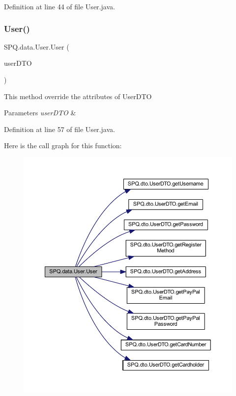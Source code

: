 Definition at line 44 of file User.\+java.

\mbox{\label{class_s_p_q_1_1data_1_1_user_af8e381901a649027950a0b0f8b22a235}} 
\subsubsection{\texorpdfstring{User()}{User()}\hspace{0.1cm}{\footnotesize\ttfamily [4/5]}}
{\footnotesize\ttfamily S\+P\+Q.\+data.\+User.\+User (\begin{DoxyParamCaption}\item[{\mbox{\hyperlink{class_s_p_q_1_1dto_1_1_user_d_t_o}{User\+D\+TO}}}]{user\+D\+TO }\end{DoxyParamCaption})}

This method override the attributes of User\+D\+TO 
\begin{DoxyParams}{Parameters}
{\em user\+D\+TO} & \\
\hline
\end{DoxyParams}


Definition at line 57 of file User.\+java.

Here is the call graph for this function\+:\nopagebreak
\begin{figure}[H]
\begin{center}
\leavevmode
\includegraphics[width=350pt]{class_s_p_q_1_1data_1_1_user_af8e381901a649027950a0b0f8b22a235_cgraph}
\end{center}
\end{figure}
\mbox{\label{class_s_p_q_1_1data_1_1_user_aa21a25c33b963c3af6fb07331f4cd400}} 
